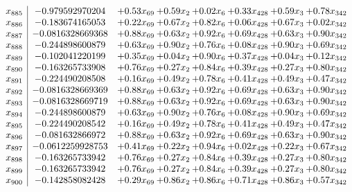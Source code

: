 \documentclass[8pt]{article}
\begin{document}
\[\begin{array}{c| c c@{\hskip 2pt} c@{\hskip 2pt} c@{\hskip 2pt} c@{\hskip 2pt} c@{\hskip 2pt} c@{\hskip 2pt} }
 x_{885}   &  -0.979592970204 & +  0.53 x_{69} & +  0.59 x_{2} & +  0.02 x_{6} & +  0.33 x_{428} & +  0.59 x_{3} & +  0.78 x_{342}\\
 x_{886}   &  -0.183674165053 & +  0.22 x_{69} & +  0.67 x_{2} & +  0.82 x_{6} & +  0.06 x_{428} & +  0.67 x_{3} & +  0.02 x_{342}\\
 x_{887}   &  -0.0816328669368 & +  0.88 x_{69} & +  0.63 x_{2} & +  0.92 x_{6} & +  0.69 x_{428} & +  0.63 x_{3} & +  0.90 x_{342}\\
 x_{888}   &  -0.244898600879 & +  0.63 x_{69} & +  0.90 x_{2} & +  0.76 x_{6} & +  0.08 x_{428} & +  0.90 x_{3} & +  0.69 x_{342}\\
 x_{889}   &  -0.102041220199 & +  0.35 x_{69} & +  0.04 x_{2} & +  0.90 x_{6} & +  0.37 x_{428} & +  0.04 x_{3} & +  0.12 x_{342}\\
 x_{890}   &  -0.163265733908 & +  0.76 x_{69} & +  0.27 x_{2} & +  0.84 x_{6} & +  0.39 x_{428} & +  0.27 x_{3} & +  0.80 x_{342}\\
 x_{891}   &  -0.224490208508 & +  0.16 x_{69} & +  0.49 x_{2} & +  0.78 x_{6} & +  0.41 x_{428} & +  0.49 x_{3} & +  0.47 x_{342}\\
 x_{892}   &  -0.0816328669369 & +  0.88 x_{69} & +  0.63 x_{2} & +  0.92 x_{6} & +  0.69 x_{428} & +  0.63 x_{3} & +  0.90 x_{342}\\
 x_{893}   &  -0.0816328669719 & +  0.88 x_{69} & +  0.63 x_{2} & +  0.92 x_{6} & +  0.69 x_{428} & +  0.63 x_{3} & +  0.90 x_{342}\\
 x_{894}   &  -0.244898600879 & +  0.63 x_{69} & +  0.90 x_{2} & +  0.76 x_{6} & +  0.08 x_{428} & +  0.90 x_{3} & +  0.69 x_{342}\\
 x_{895}   &  -0.224490208542 & +  0.16 x_{69} & +  0.49 x_{2} & +  0.78 x_{6} & +  0.41 x_{428} & +  0.49 x_{3} & +  0.47 x_{342}\\
 x_{896}   &  -0.081632866972 & +  0.88 x_{69} & +  0.63 x_{2} & +  0.92 x_{6} & +  0.69 x_{428} & +  0.63 x_{3} & +  0.90 x_{342}\\
 x_{897}   &  -0.0612259928753 & +  0.41 x_{69} & +  0.22 x_{2} & +  0.94 x_{6} & +  0.02 x_{428} & +  0.22 x_{3} & +  0.67 x_{342}\\
 x_{898}   &  -0.163265733942 & +  0.76 x_{69} & +  0.27 x_{2} & +  0.84 x_{6} & +  0.39 x_{428} & +  0.27 x_{3} & +  0.80 x_{342}\\
 x_{899}   &  -0.163265733942 & +  0.76 x_{69} & +  0.27 x_{2} & +  0.84 x_{6} & +  0.39 x_{428} & +  0.27 x_{3} & +  0.80 x_{342}\\
 x_{900}   &  -0.142858082428 & +  0.29 x_{69} & +  0.86 x_{2} & +  0.86 x_{6} & +  0.71 x_{428} & +  0.86 x_{3} & +  0.57 x_{342}\\

\end{array}\]
\end{document}
